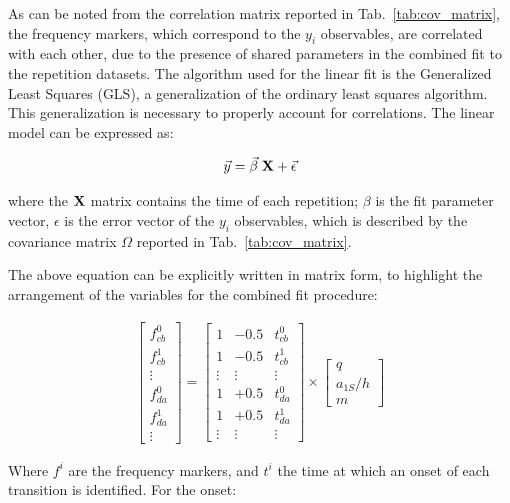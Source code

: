 As can be noted from the correlation matrix reported in Tab.~\ref{tab:cov_matrix}, the frequency markers, which correspond to the $y_{i}$ observables, are correlated with each other, due to the presence of shared parameters in the combined fit to the repetition datasets.
The algorithm used for the linear fit is the Generalized Least Squares (GLS), a generalization of the ordinary least squares algorithm. This generalization is necessary to properly account for correlations. The linear model can be expressed as:

\begin{equation}
    \vec{y} = \vec{\beta} \; {\bf X} + \vec{\epsilon}
\end{equation}

where the ${\bf X}$ matrix contains the time of each repetition; $\beta$ is the fit parameter vector, $\epsilon$ is the error vector of the $y_{i}$ observables, which is described by the covariance matrix $\Omega$ reported in Tab.~\ref{tab:cov_matrix}. 

The above equation can be explicitly written in matrix form, to highlight the arrangement of the variables for the combined fit procedure:

\begin{gather}
\begin{bmatrix}
f_{cb}^{0} \\
f_{cb}^{1} \\
\vdots     \\
f_{da}^{0} \\
f_{da}^{1} \\
\vdots
\end{bmatrix} =
\begin{bmatrix}
    1        & -0.5   & t_{cb}^{0}    \\
    1        & -0.5   & t_{cb}^{1}    \\
    \vdots   & \vdots & \vdots      \\
    1        & +0.5   &  t_{da}^{0} \\
    1        & +0.5   &  t_{da}^{1} \\
    \vdots   & \vdots & \vdots
\end{bmatrix} \times
\begin{bmatrix}
    q   \\
    a_{1S}/h \\
    m
\end{bmatrix}
\end{gather}

Where $f^{i}$ are the frequency markers, and $t^{i}$ the time at which an onset of each transition is identified. For the \da onset:

